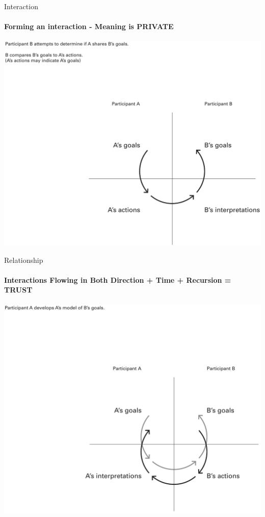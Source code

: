 \documentclass[
	11pt,
	aspectratio=169,
]{beamer}
\begin{document}
    \begin{frame}{Interaction}
        \framesubtitle{Forming an interaction - Meaning is PRIVATE}
        \centering\includegraphics[height=0.75\textheight]{resources/interaction1.png}
    \end{frame}
    \begin{frame}{Relationship}
        \framesubtitle{Interactions Flowing in Both Direction + Time + Recursion = TRUST}
        \centering\includegraphics[height=0.75\textheight]{resources/interaction2.png}
    \end{frame}
\end{document}
